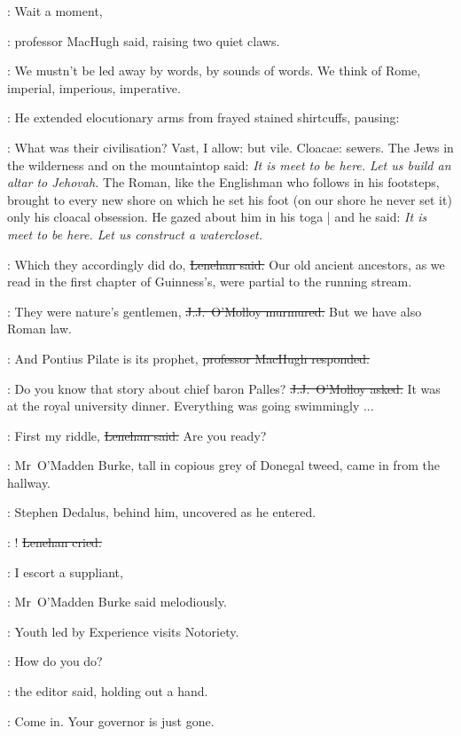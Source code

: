 
\machugh:
Wait a moment,

:
professor MacHugh said,
raising two quiet claws.

\machugh:
We mustn't be led away by words,
by sounds of words.
We think of Rome,
imperial, imperious, imperative.

:
He extended elocutionary arms from frayed stained shirtcuffs,
pausing:

\machugh:
What was their civilisation?
Vast, I allow:
but vile.
Cloacae: sewers.
The Jews in the wilderness and on the mountaintop said:
\emph{It is meet to be here.
Let us build an altar to Jehovah.}
The Roman,
like the Englishman who follows in his footsteps,
brought to every new shore on which he set his foot
(on our shore he never set it)
only his cloacal obsession.
He gazed about him in his toga |
and he said:
\emph{It is meet to be here.
Let us construct a watercloset.}

\lenehan:
Which they accordingly did do,
\sout{Lenehan said.}
Our old ancient ancestors,
as we read in the first chapter of Guinness's,
were partial to the running stream.

\jjom:
They were nature's gentlemen,
\sout{J.J.~O'Molloy murmured.}
But we have also Roman law.%

\machugh:
And Pontius Pilate is its prophet,
\sout{professor MacHugh responded.}

\jjom:
Do you know that story about chief baron Palles?
\sout{J.J.~O'Molloy asked.}
It was at the royal university dinner.
Everything was going swimmingly ...

\lenehan:
First my riddle,
\sout{Lenehan said.}
Are you ready?

:
Mr~O'Madden Burke,
tall in copious grey of Donegal tweed,
came in from the hallway.

:
Stephen Dedalus,
behind him,
uncovered as he entered.

\lenehan:
!
\sout{Lenehan cried.}

\omaddenburke:
I escort a suppliant,

:
Mr~O'Madden Burke said melodiously.

\omaddenburke:
Youth led by Experience visits Notoriety.

\crawford:
How do you do?

:
the editor said,
holding out a hand.

\crawford:
Come in.
Your governor is just gone.


